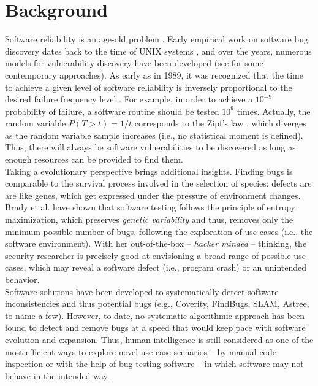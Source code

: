 \section{Background}
\label{sec:related}

Software reliability is an age-old problem \cite{littlewood1973bayesian,adams1984textordfeminineoptimizing,littlewood1989predicting}. Early empirical work on software bug discovery dates back to the time of UNIX systems \cite{miller1990empirical}, and over the years, numerous models for vulnerability discovery have been developed (see \cite{avgerinos2014enhancing,zhao2016empirical} for some contemporary approaches). As early as in 1989, it was recognized that the time to achieve a given level of software reliability is inversely proportional to the desired failure frequency level \cite{adams1984textordfeminineoptimizing}. For example, in order to achieve a $10^{-9}$ probability of failure, a software routine should be tested  $10^{9}$ times. Actually, the random variable $P(T > t) = 1/t$ corresponds to the Zipf's law \cite{maillart2008empirical,saichev2009theory}, which diverges as the random variable sample increases (i.e., no statistical moment is defined). Thus, there will always be software vulnerabilities to be discovered as long as enough resources can be provided to find them.\\

Taking a evolutionary perspective brings additional insights. Finding bugs is comparable to the survival process involved in the selection of species: defects are are like genes, which get expressed under the pressure of environment changes. Brady et al. \cite{brady1999murphy} have shown that software testing follows the principle of entropy maximization, which preserves {\it genetic variability}  and thus, removes only the minimum possible number of bugs, following the exploration of use cases (i.e., the software environment). With her out-of-the-box -- {\it hacker minded} -- thinking, the security researcher is precisely good at envisioning a broad range of possible use cases, which may reveal a software defect (i.e., program crash) or an unintended behavior.\\

Software solutions have been developed to systematically detect software inconsistencies and thus potential bugs (e.g., Coverity, FindBugs, SLAM, Astree, to name a few). However, to date, no systematic algorithmic approach has been found to detect and remove bugs at a speed that would keep pace with software evolution and expansion. Thus, human intelligence is still considered as one of the most efficient ways to explore novel use case scenarios -- by manual code inspection or with the help of bug testing software -- in which software may not behave in the intended way.\\

